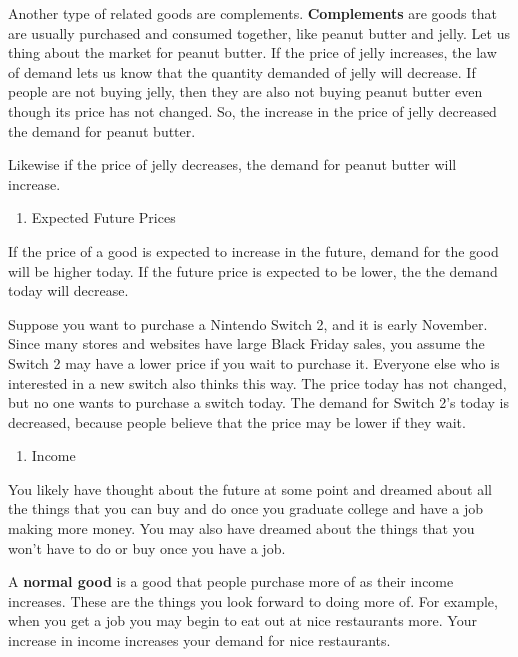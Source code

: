 \documentclass[
]{book}
\providecommand{\tightlist}{%
  \setlength{\itemsep}{0pt}\setlength{\parskip}{0pt}}
\begin{document}
Another type of related goods are complements. \textbf{Complements }are goods that are usually purchased and consumed together, like peanut butter and jelly. Let us thing about the market for peanut butter. If the price of jelly increases, the law of demand lets us know that the quantity demanded of jelly will decrease. If people are not buying jelly, then they are also not buying peanut butter even though its price has not changed. So, the increase in the price of jelly decreased the demand for peanut butter.

Likewise if the price of jelly decreases, the demand for peanut butter will increase.

\begin{enumerate}
\def\labelenumi{\arabic{enumi}.}
\setcounter{enumi}{1}
\tightlist
\item
  Expected Future Prices
\end{enumerate}

If the price of a good is expected to increase in the future, demand for the good will be higher today. If the future price is expected to be lower, the the demand today will decrease.

Suppose you want to purchase a Nintendo Switch 2, and it is early November. Since many stores and websites have large Black Friday sales, you assume the Switch 2 may have a lower price if you wait to purchase it. Everyone else who is interested in a new switch also thinks this way. The price today has not changed, but no one wants to purchase a switch today. The demand for Switch 2's today is decreased, because people believe that the price may be lower if they wait.

\begin{enumerate}
\def\labelenumi{\arabic{enumi}.}
\setcounter{enumi}{2}
\tightlist
\item
  Income
\end{enumerate}

You likely have thought about the future at some point and dreamed about all the things that you can buy and do once you graduate college and have a job making more money. You may also have dreamed about the things that you won't have to do or buy once you have a job.

A \textbf{normal good} is a good that people purchase more of as their income increases. These are the things you look forward to doing more of. For example, when you get a job you may begin to eat out at nice restaurants more. Your increase in income increases your demand for nice restaurants.
\end{document}
